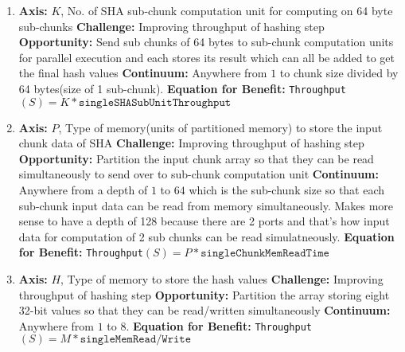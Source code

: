 \documentclass{article}
\begin{document}
\begin{enumerate}
\begin{enumerate}
\item%

\textbf{Axis:} $K$, No. of SHA sub-chunk computation unit for computing on 64 byte sub-chunks
\newline
\textbf{Challenge:} Improving throughput of hashing step
\newline
\textbf{Opportunity:} Send sub chunks of 64 bytes to sub-chunk computation units for parallel execution and each stores its result which can all be added to get the final hash values
\newline
\textbf{Continuum:} Anywhere from $1$ to chunk size divided by 64 bytes(size of 1 sub-chunk).  
\newline
\textbf{Equation for Benefit:} \texttt{Throughput}$\left(S\right)=K*\texttt{singleSHASubUnitThroughput}$

\item%

\textbf{Axis:} $P$, Type of memory(units of partitioned memory) to store the input chunk data of SHA
\newline
\textbf{Challenge:} Improving throughput of hashing step
\newline
\textbf{Opportunity:} Partition the input chunk array so that they can be read simultaneously to send over to sub-chunk computation unit
\newline
\textbf{Continuum:} Anywhere from a depth of $1$ to $64$ which is the sub-chunk size so that each sub-chunk input data can be read from memory simultaneously. Makes more sense to have a depth of 128 because there are 2 ports and that's how input data for computation of 2 sub chunks can be read simulatneously.    
\newline
\textbf{Equation for Benefit:} \texttt{Throughput}$\left(S\right)=P*\texttt{singleChunkMemReadTime}$

\item%

\textbf{Axis:} $H$, Type of memory to store the hash values
\newline
\textbf{Challenge:} Improving throughput of hashing step
\newline
\textbf{Opportunity:} Partition the array storing eight 32-bit values so that they can be read/written simultaneously
\newline
\textbf{Continuum:} Anywhere from $1$ to $8$.  
\newline
\textbf{Equation for Benefit:} \texttt{Throughput}$\left(S\right)=M*\texttt{singleMemRead/Write}$


\end{enumerate}
\end{enumerate}
\end{document}
